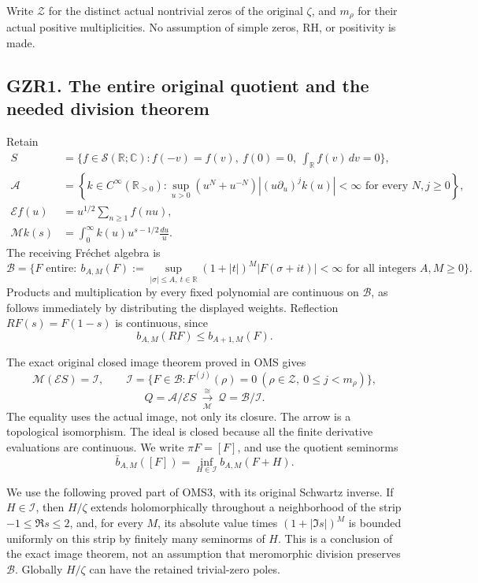 Write \(\mathscr Z\) for the distinct actual nontrivial zeros of the
original \(\zeta\), and \(m_\rho\) for their actual positive
multiplicities. No assumption of simple zeros, RH, or positivity is
made.

\subsection{GZR1. The entire original quotient and the needed division
theorem}\label{gzr1.-the-entire-original-quotient-and-the-needed-division-theorem}

Retain \[
\begin{aligned}
S&=\{f\in\mathcal S(\mathbb R;\mathbb C):
 f(-v)=f(v),\ f(0)=0,\ \int_{\mathbb R}f(v)\,dv=0\},\\
\mathcal A&=\left\{k\in C^\infty(\mathbb R_{>0}):
 \sup_{u>0}(u^N+u^{-N})|(u\partial_u)^jk(u)|<\infty
 \text{ for every }N,j\ge0\right\},\\
\mathcal Ef(u)&=u^{1/2}\sum_{n\ge1}f(nu),\\
\mathcal Mk(s)&=\int_0^\infty k(u)u^{s-1/2}\frac{du}{u}.
\end{aligned}
\tag{GZR1.1}
\] The receiving Fréchet algebra is \[
\mathcal B=\{F\text{ entire}:\
 b_{A,M}(F):=\sup_{|\sigma|\le A,\ t\in\mathbb R}
 (1+|t|)^M|F(\sigma+it)|<\infty
 \text{ for all integers }A,M\ge0\}.
\tag{GZR1.2}
\] Products and multiplication by every fixed polynomial are continuous
on \(\mathcal B\), as follows immediately by distributing the displayed
weights. Reflection \(RF(s)=F(1-s)\) is continuous, since \[
b_{A,M}(RF)\le b_{A+1,M}(F).
\tag{GZR1.3}
\]

The exact original closed image theorem proved in OMS gives \[
\mathcal M(\mathcal ES)=\mathcal I,\qquad
\mathcal I=\{F\in\mathcal B:F^{(j)}(\rho)=0\
(\rho\in\mathscr Z,\ 0\le j<m_\rho)\},
\] \[
Q=\mathcal A/\mathcal ES
\ \xrightarrow[\mathcal M]{\ \cong\ }\ 
\mathcal Q=\mathcal B/\mathcal I .
\tag{GZR1.4}
\] The equality uses the actual image, not only its closure. The arrow
is a topological isomorphism. The ideal is closed because all the finite
derivative evaluations are continuous. We write \(\pi F=[F]\), and use
the quotient seminorms \[
\bar b_{A,M}([F])=\inf_{H\in\mathcal I}b_{A,M}(F+H).
\tag{GZR1.5}
\]

We use the following proved part of OMS3, with its original Schwartz
inverse. If \(H\in\mathcal I\), then \(H/\zeta\) extends holomorphically
throughout a neighborhood of the strip \(-1\le\Re s\le2\), and, for
every \(M\), its absolute value times \((1+|\Im s|)^M\) is bounded
uniformly on this strip by finitely many seminorms of \(H\). This is a
conclusion of the exact image theorem, not an assumption that
meromorphic division preserves \(\mathcal B\). Globally \(H/\zeta\) can
have the retained trivial-zero poles.

